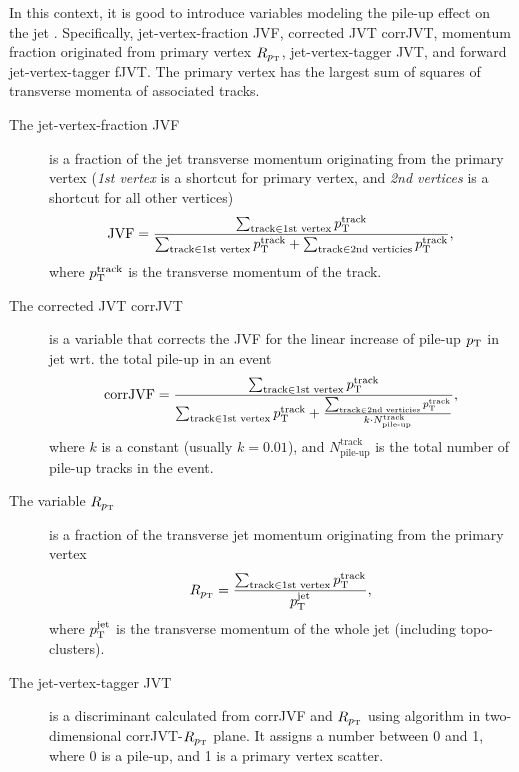 In this context, it is good to introduce variables modeling the pile-up effect on the jet \cite{jvt}.
Specifically, jet-vertex-fraction JVF, corrected JVT corrJVT, momentum fraction originated from primary vertex $R_{p_\text{T}}$, jet-vertex-tagger JVT, and forward jet-vertex-tagger fJVT.
The primary vertex has the largest sum of squares of transverse momenta of associated tracks.
\begin{description}
     
    \item[The jet-vertex-fraction JVF] is a fraction of the jet transverse momentum originating from the primary vertex (\emph{1st vertex} is a shortcut for primary vertex, and \emph{2nd vertices} is a shortcut for all other vertices)
    \begin{equation}
        \label{eq:jvf}
    \text{JVF} = \frac{\sum_{\text{track} \in \text{1st vertex}} p_\text{T}^{\text{track}}}{\sum_{\text{track} \in \text{1st vertex}} p_\text{T}^{\text{track}} + \sum_{\text{track} \in \text{2nd verticies}} p_\text{T}^{\text{track}}},
    \end{equation}
    where $p_\text{T}^{\text{track}}$ is the transverse momentum of the track. 
    
    \item[The corrected JVT corrJVT] is a variable that corrects the JVF for the linear increase of pile-up $p_\text{T}$ in jet wrt. the total pile-up in an event
    \begin{equation}
        \label{eq:corr_jvf}
        \text{corrJVF} = \frac{\sum_{\text{track} \in \text{1st vertex}} p_\text{T}^{\text{track}}}{\sum_{\text{track} \in \text{1st vertex}} p_\text{T}^{\text{track}} + \frac{\sum_{\text{track} \in \text{2nd verticies}} p_\text{T}^{\text{track}}}{k\cdot N^{\text{track}}_{\text{pile-up}}}},
    \end{equation}
    where $k$ is a constant (usually $k=0.01$), and $N^{\text{track}}_{\text{pile-up}}$ is the total number of pile-up tracks in the event.
    
    
    \item[The variable $R_{p_\text{T}}$] is a fraction of the transverse jet momentum originating from the primary vertex
    \begin{equation}
        \label{eq:rpt}
        R_{p_\text{T}} = \frac{\sum_{\text{track} \in \text{1st vertex}} p_\text{T}^{\text{track}}}{p_\text{T}^{\text{jet}}},
    \end{equation}
    where $p_\text{T}^{\text{jet}}$ is the transverse momentum of the whole jet (including topo-clusters).

    \item[The jet-vertex-tagger JVT] is a discriminant calculated from corrJVF and $R_{p_\text{T}}$ using \kNN algorithm in two-dimensional corrJVT-$R_{p_\text{T}}$ plane. 
    It assigns a number between 0 and 1, where 0 is a pile-up, and 1 is a primary vertex scatter.


\end{description}
